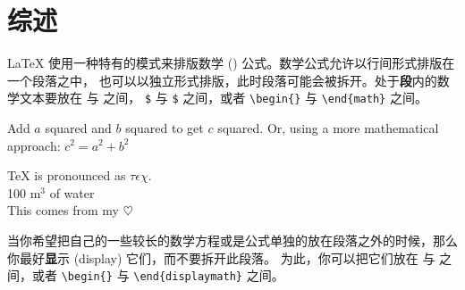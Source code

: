 \section{综述}
\LaTeX{} 使用一种特有的模式来排版数学 () 公式。数学公式允许以行间形式排版在一个段落之中，
也可以以独立形式排版，此时段落可能会被拆开。处于{\textbf
段内}的数学文本要放在 \ci{(} 与 \ci{)} 之间，
\texttt{\$} 与 \texttt{\$} 之间，或者 \verb|\begin{|\verb|}| 与 \verb|\end{math}| 之间。

\begin{example}
Add $a$ squared and $b$ squared
to get $c$ squared. Or, using
a more mathematical approach:
$c^{2}=a^{2}+b^{2}$
\end{example}
\begin{example}
\TeX{} is pronounced as
\(\tau\epsilon\chi\).\\[6pt]
100 m$^{3}$ of water\\[6pt]
This comes from my
\begin{math}\heartsuit\end{math}
\end{example}


当你希望把自己的一些较长的数学方程或是公式单独的放在段落之外的时候，那么你最好{\textbf
显示} (display) 它们，而不要拆开此段落。
为此，你可以把它们放在 \ci{[} 与 \ci{]} 之间，或者 \verb|\begin{|\verb|}| 与 \verb|\end{displaymath}| 之间。

